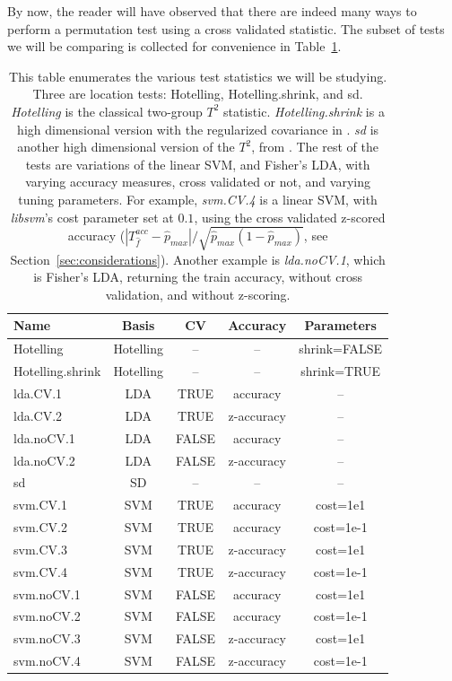 \documentclass[12pt,a4paper]{article}
\newcommand{\hyp}{f} %
\newcommand{\hypEstim}{\hat{\hyp}} %
\newcommand{\acc}{T^{acc}}
\newcommand{\dominant}{\hat{p}_{max}}
\begin{document}
By now, the reader will have observed that there are indeed many ways to perform a permutation test using a cross validated statistic. 
The subset of tests we will be comparing is collected for convenience in Table~\ref{tab:collected}.


\begin{table}[h]
\centering
\begin{tabular}{l|c|c|c|c}
Name & Basis & CV & Accuracy & Parameters\\ 
\hline
\hline
Hotelling & Hotelling & -- & -- & shrink=FALSE\\ 
Hotelling.shrink & Hotelling & -- & -- & shrink=TRUE \\ 
lda.CV.1 & LDA & TRUE & accuracy &  -- \\ 
lda.CV.2 & LDA & TRUE & z-accuracy & -- \\ 
lda.noCV.1 & LDA & FALSE & accuracy &  --\\ 
lda.noCV.2 & LDA & FALSE & z-accuracy &  --\\ 
sd & SD & -- & -- & -- \\ 
svm.CV.1 & SVM & TRUE & accuracy & cost=1e1 \\ 
svm.CV.2 & SVM & TRUE & accuracy & cost=1e-1 \\ 
svm.CV.3 & SVM & TRUE & z-accuracy & cost=1e1 \\ 
svm.CV.4 & SVM & TRUE & z-accuracy & cost=1e-1 \\ 
svm.noCV.1 & SVM & FALSE & accuracy & cost=1e1 \\ 
svm.noCV.2 & SVM & FALSE & accuracy & cost=1e-1 \\ 
svm.noCV.3 & SVM & FALSE & z-accuracy & cost=1e1 \\ 
svm.noCV.4 & SVM & FALSE & z-accuracy & cost=1e-1 \\
\end{tabular} 
\caption{\footnotesize
This table enumerates the various test statistics we will be studying. 
Three are location tests: Hotelling, Hotelling.shrink, and sd.
\textit{Hotelling} is the classical two-group $T^2$ statistic. 
\textit{Hotelling.shrink} is a high dimensional version with the regularized covariance in \cite{schafer_shrinkage_2005}. 
\textit{sd} is another high dimensional version of the $T^2$, from \cite{srivastava_two_2013}. 
The rest of the tests are variations of the linear SVM, and Fisher's LDA, with varying accuracy measures, cross validated or not, and varying tuning parameters. 
For example, \textit{svm.CV.4} is a linear SVM, with \textit{libsvm}'s cost parameter set at $0.1$, using the cross validated z-scored accuracy ($|\acc_{\hypEstim}-\dominant|/\sqrt{\dominant(1-\dominant)}$, see Section~\ref{sec:considerations}).
Another example is \textit{lda.noCV.1}, which is Fisher's LDA, returning the train accuracy, without cross validation, and without z-scoring. 
}
\label{tab:collected}
\end{table}
\end{document}
